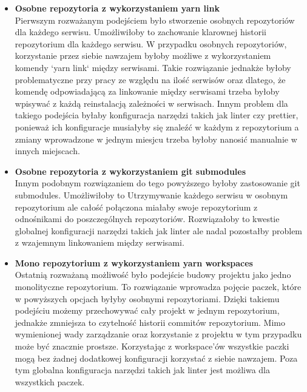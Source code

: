 \begin{itemize}
    \item \textbf {Osobne repozytoria z wykorzystaniem yarn link} \\
        Pierwszym rozważanym podejściem było stworzenie osobnych repozytoriów dla każdego serwisu.
        Umożliwiłoby to zachowanie klarownej historii repozytorium dla każdego serwisu. W przypadku osobnych repozytoriów, korzystanie przez siebie nawzajem byłoby możliwe z wykorzystaniem komendy `yarn link` między serwisami. Takie rozwiązanie jednakże byłoby problematyczne przy pracy ze względu na ilość serwisów oraz dlatego, że komendę odpowiadającą za linkowanie między serwisami trzeba byłoby wpisywać z każdą reinstalacją zależności w serwisach. Innym problem dla takiego podejścia byłaby konfiguracja narzędzi takich jak linter czy prettier, ponieważ ich konfiguracje musiałyby się znaleźć w każdym z repozytorium a zmiany wprowadzone w jednym miesjcu trzeba byłoby nanosić manualnie w innych miejscach.

    \item \textbf {Osobne repozytoria z wykorzystaniem git submodules} \\
        Innym podobnym rozwiązaniem do tego powyższego byłoby zastosowanie git submodules. Umożliwiłoby to Utrzymywanie każdego serwisu w osobnym repozytorium ale całość połączona miałaby swoje repozytorium z odnośnikami do poszczególnych repozytoriów. Rozwiązałoby to kwestie globalnej konfiguracji narzędzi takich jak linter ale nadal pozostałby problem z wzajemnym linkowaniem między serwisami.

    \item \textbf {Mono repozytorium z wykorzystaniem yarn workspaces} \\
        Ostatnią rozważaną możliwość było podejście budowy projektu jako jedno monolityczne repozytorium. To rozwiązanie wprowadza pojęcie paczek, które w powyższych opcjach byłyby osobnymi repozytoriami. Dzięki takiemu podejściu możemy przechowywać cały projekt w jednym repozytorium, jednakże zmniejsza to czytelność historii commitów repozytorium. Mimo wymienionej wady zarządzanie oraz korzystanie z projektu w tym przypadku może być znacznie prostsze. Korzystając z workspace'ów wszystkie paczki mogą bez żadnej dodatkowej konfiguracji korzystać z siebie nawzajem. Poza tym globalna konfiguracja narzędzi takich jak linter jest możliwa dla wszystkich paczek.

\end{itemize}

